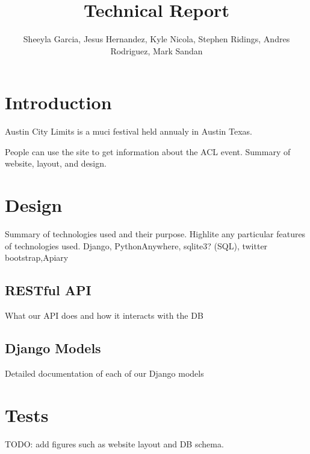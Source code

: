 \documentclass[12pt,leqno]{article}
\title{Technical Report}
\author{Sheeyla Garcia, Jesus Hernandez, Kyle Nicola, Stephen Ridings, Andres Rodriguez, Mark Sandan}
\date{ }
\numberwithin{equation}{section}
\theoremstyle{definition}
\begin{document}
\thispagestyle{plain}
 
\maketitle
 
\tableofcontents
\section{Introduction} 
Austin City Limits is a muci festival held annualy in Austin Texas.

People can use the site to get information about the ACL event.
Summary of website, layout, and design.  

\section{Design}
Summary of technologies used and their purpose. Highlite any particular features of technologies used.
Django, PythonAnywhere, sqlite3? (SQL), twitter bootstrap,Apiary


\subsection{RESTful  API}
What our API does and how it interacts with the DB

\subsection{Django Models}
Detailed documentation of each of our Django models
\section{Tests}


TODO: add figures such as website layout and DB schema.
\end{document}
